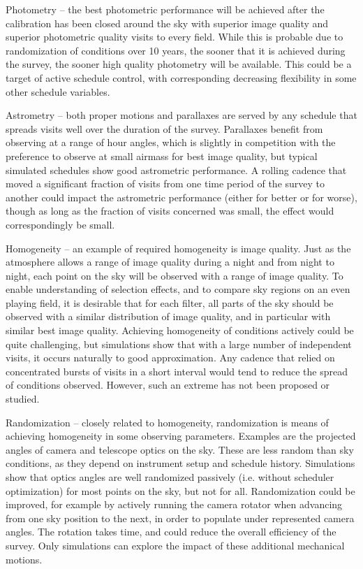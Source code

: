 \begin{description}

\item{Photometry} -- the best photometric performance will be achieved
after the calibration has been closed around the sky with superior image
quality and superior photometric quality visits to every field.  While
this is probable due to randomization of conditions over 10 years, the
sooner that it is achieved during the survey, the sooner high quality
photometry will be available.  This could be a target of active schedule
control, with corresponding decreasing flexibility in some other
schedule variables.

\item{Astrometry} -- both proper motions and parallaxes are served by
any schedule that spreads visits well over the duration of the survey.
Parallaxes benefit from observing at a range of hour angles, which is
slightly in competition with the preference to observe at small airmass
for best image quality, but typical simulated schedules show good
astrometric performance. A rolling cadence that moved a significant
fraction of visits from one time period of the survey to another could
impact the astrometric performance (either for better or for worse),
though as long as the fraction of visits concerned was small, the effect
would correspondingly be small.

\item{Homogeneity} -- an  example of required homogeneity is image
quality. Just as the atmosphere allows a range of image quality during a
night and from night to night, each point on the sky will be observed
with a range of image quality.  To enable understanding of selection
effects, and to compare sky regions on an even playing field, it is
desirable that for each filter, all parts of the sky should be observed
with a similar distribution of image quality, and in particular with
similar best image quality. Achieving homogeneity of conditions actively
could be quite challenging, but simulations show that with a large
number of independent visits, it occurs naturally to good approximation.
Any cadence that relied on concentrated bursts of visits in a short
interval would tend to reduce the spread of conditions observed.
However, such an extreme has not been proposed or studied.

\item{Randomization} -- closely related to homogeneity, randomization is
means of achieving homogeneity in some observing parameters.  Examples
are the projected angles of camera and telescope optics on the sky.
These are less random than sky conditions, as they depend on instrument
setup and schedule history.  Simulations show that optics angles are
well randomized passively (i.e. without scheduler optimization) for most
points on the sky, but not for all.  Randomization could be improved,
for example by actively running the camera rotator when advancing from
one sky position to the next, in order to populate under represented
camera angles. The rotation takes time, and could reduce the overall
efficiency of the survey.  Only simulations can explore the impact of
these additional mechanical motions.


\end{description}
